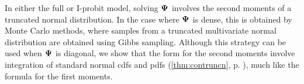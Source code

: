 \vspace{-1em}
In either the full or I-probit model, solving ${\bm\Psi}$ involves the second moments of a truncated normal distribution.
In the case where ${\bm\Psi}$ is dense, this is obtained by Monte Carlo methods, where samples from a truncated multivariate normal distribution are obtained using Gibbs sampling.
Although this strategy can be used when ${\bm\Psi}$ is diagonal, we show that the form for the second moments  involve integration of standard normal cdfs and pdfs (\cref{thm:contruncn}, p. \pageref{thm:contrunc}), much like the formula for the first moments.
